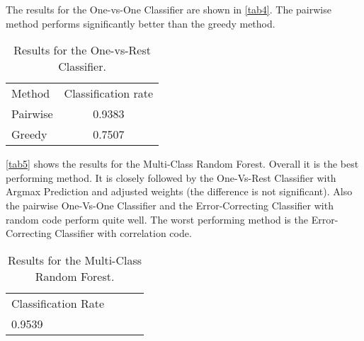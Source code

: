 \documentclass{article}
\begin{document}
The results for the One-vs-One Classifier are shown in \autoref{tab4}.
The pairwise method performs significantly better than the greedy method.

\begin{table}[h]
	\centering
	\begin{tabular}{l c}
        Method      &  Classification rate   \\
        Pairwise    &  0.9383    		     \\
        Greedy      &  0.7507                \\
	\end{tabular}
	\caption{Results for the One-vs-Rest Classifier.}
	\label{tab4}
\end{table}

\autoref{tab5} shows the results for the Multi-Class Random Forest.
Overall it is the best performing method. It is closely followed by the One-Vs-Rest Classifier with Argmax Prediction and adjusted weights (the difference is not significant). Also the pairwise One-Vs-One Classifier and the Error-Correcting Classifier with random code perform quite well. 
The worst performing method is the Error-Correcting Classifier with correlation code.

\begin{table}[h]
	\centering
	\begin{tabular}{l c c c}
        Classification Rate \\
        0.9539              \\
    \end{tabular}
	\caption{Results for the Multi-Class Random Forest.}
	\label{tab5}
\end{table}
\end{document}
